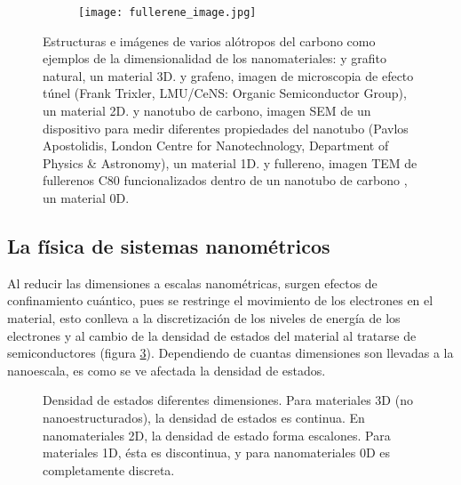 \begin{figure}
\begin{subfigure}[b]{0.2\textwidth}
		\texttt{[image: fullerene\_image.jpg]}
		\caption{}
		\label{fig:fullerene_image}
	\end{subfigure}
	\caption[Alótropos del carbono mostrando las diferentes dimensionalidades de los nanomateriales]{Estructuras e imágenes de varios alótropos del carbono como ejemplos de la dimensionalidad de los nanomateriales:   y  grafito natural, un material 3D.  y  grafeno, imagen de microscopia de efecto túnel (Frank Trixler, LMU/CeNS: Organic Semiconductor Group), un material 2D.  y  nanotubo de carbono, imagen SEM de un dispositivo para medir diferentes propiedades del nanotubo (Pavlos Apostolidis, London Centre for Nanotechnology, Department of Physics \& Astronomy), un material 1D.  y  fullereno, imagen TEM de fullerenos C80 funcionalizados dentro de un nanotubo de carbono \citep{Gimenez2011}, un material 0D.}
	\label{fig:carbon_allotropes}
\end{figure}

\subsection{La física de sistemas nanométricos}
Al reducir las dimensiones a escalas nanométricas, surgen efectos de confinamiento cuántico, pues se restringe el movimiento de los electrones en el material, esto conlleva a la discretización de los niveles de energía de los electrones y al cambio de la densidad de estados del material al tratarse de semiconductores (figura \ref{fig:DoE}). Dependiendo de cuantas dimensiones son llevadas a la nanoescala, es como se ve afectada la densidad de estados.

\begin{figure}[h!]
	\centering
	\caption[Densidad de estados en diferentes dimensionalidades]{Densidad de estados diferentes dimensiones. Para materiales 3D (no nanoestructurados), la densidad de estados es continua. En nanomateriales 2D, la densidad de estado forma escalones. Para materiales 1D, ésta es discontinua, y para nanomateriales 0D es completamente discreta. }
	\label{fig:DoE}
\end{figure}

